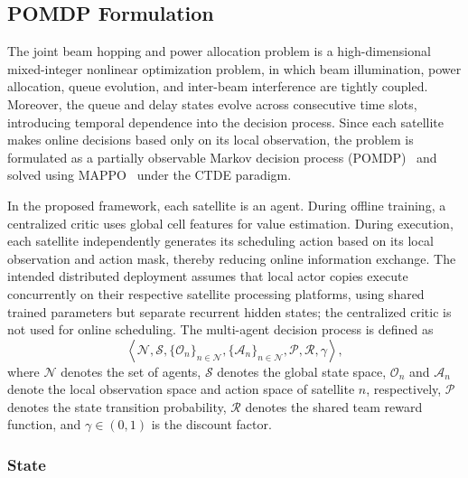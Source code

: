 \documentclass[journal]{IEEEtran}
\newcommand{\revbegin}[1]{\color{revisionblue}\ignorespaces}
\newcommand{\revend}[1]{\color{black}\ignorespaces}
\begin{document}
\subsection{POMDP Formulation}
\label{subsec:pomdp-formulation}

The joint beam hopping and power allocation problem is a high-dimensional mixed-integer nonlinear optimization problem, in which beam illumination, power allocation, queue evolution, and inter-beam interference are tightly coupled. Moreover, the queue and delay states evolve across consecutive time slots, introducing temporal dependence into the decision process. Since each satellite makes online decisions based only on its local observation, the problem is formulated as a partially observable \revbegin{}Markov decision process (POMDP)\revend{}~\cite{ref30} and solved using MAPPO~\cite{ref31} under the CTDE paradigm.

\revbegin{}In the proposed framework, each satellite is an agent. During offline training, a centralized critic uses global cell features for value estimation. During execution, each satellite independently generates its scheduling action based on its local observation and action mask, thereby reducing online information exchange. The intended distributed deployment assumes that local actor copies execute concurrently on their respective satellite processing platforms, using shared trained parameters but separate recurrent hidden states; the centralized critic is not used for online scheduling. The multi-agent decision process is defined as\revend{}
\begin{equation}
\left\langle
\mathcal{N},\mathcal{S},
\{\mathcal{O}_n\}_{n\in\mathcal{N}},
\{\mathcal{A}_n\}_{n\in\mathcal{N}},
\mathcal{P},\mathcal{R},\gamma
\right\rangle,
\end{equation}
where $\mathcal{N}$ denotes the set of agents, $\mathcal{S}$ denotes the global state space, $\mathcal{O}_n$ and $\mathcal{A}_n$ denote the local observation space and action space of satellite $n$, respectively, $\mathcal{P}$ denotes the state transition probability, $\mathcal{R}$ denotes the shared team reward function, and $\gamma\in(0,1)$ is the discount factor.

\subsubsection{State}
\end{document}

